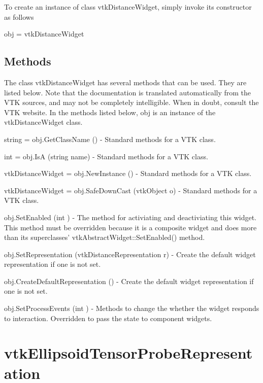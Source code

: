 To create an instance of class vtk\-Distance\-Widget, simply invoke its constructor as follows \begin{DoxyVerb}  obj = vtkDistanceWidget
\end{DoxyVerb}
 \hypertarget{vtkwidgets_vtkxyplotwidget_Methods}{}\subsection{Methods}\label{vtkwidgets_vtkxyplotwidget_Methods}
The class vtk\-Distance\-Widget has several methods that can be used. They are listed below. Note that the documentation is translated automatically from the V\-T\-K sources, and may not be completely intelligible. When in doubt, consult the V\-T\-K website. In the methods listed below, {\ttfamily obj} is an instance of the vtk\-Distance\-Widget class. 
\begin{DoxyItemize}
\item {\ttfamily string = obj.\-Get\-Class\-Name ()} -\/ Standard methods for a V\-T\-K class.  
\item {\ttfamily int = obj.\-Is\-A (string name)} -\/ Standard methods for a V\-T\-K class.  
\item {\ttfamily vtk\-Distance\-Widget = obj.\-New\-Instance ()} -\/ Standard methods for a V\-T\-K class.  
\item {\ttfamily vtk\-Distance\-Widget = obj.\-Safe\-Down\-Cast (vtk\-Object o)} -\/ Standard methods for a V\-T\-K class.  
\item {\ttfamily obj.\-Set\-Enabled (int )} -\/ The method for activiating and deactiviating this widget. This method must be overridden because it is a composite widget and does more than its superclasses' vtk\-Abstract\-Widget\-::\-Set\-Enabled() method.  
\item {\ttfamily obj.\-Set\-Representation (vtk\-Distance\-Representation r)} -\/ Create the default widget representation if one is not set.  
\item {\ttfamily obj.\-Create\-Default\-Representation ()} -\/ Create the default widget representation if one is not set.  
\item {\ttfamily obj.\-Set\-Process\-Events (int )} -\/ Methods to change the whether the widget responds to interaction. Overridden to pass the state to component widgets.  
\end{DoxyItemize}\hypertarget{vtkwidgets_vtkellipsoidtensorproberepresentation}{}\section{vtk\-Ellipsoid\-Tensor\-Probe\-Representation}\label{vtkwidgets_vtkellipsoidtensorproberepresentation}
